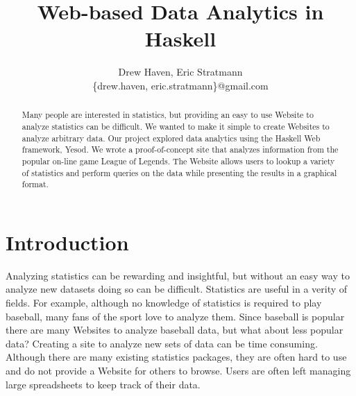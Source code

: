 \documentclass[letterpaper,twocolumn,9pt]{article}
\begin{document}
\vspace{-5cm}
\title{\Large \bf Web-based Data Analytics in Haskell}

\date{}

\author{
{\rm Drew Haven, Eric Stratmann}\\
\{drew.haven, eric.stratmann\}@gmail.com
} %

\maketitle


\begin{abstract}
Many people are interested in statistics, but providing an easy to use Website to analyze statistics can be difficult. We wanted to make it simple to create Websites to analyze arbitrary data. Our project explored data analytics using the Haskell Web framework, Yesod. We wrote a proof-of-concept site that analyzes information from the popular on-line game League of Legends. The Website allows users to lookup a variety of statistics and perform queries on the data while presenting the results in a graphical format.
\end{abstract}

\section{Introduction}

Analyzing statistics can be rewarding and insightful, but without an easy way to analyze new datasets doing so can be difficult. Statistics are useful in a verity of fields. For example, although no knowledge of statistics is required to play baseball, many fans of the sport love to analyze them. Since baseball is popular there are many Websites to analyze baseball data, but what about less popular data? Creating a site to analyze new sets of data can be time consuming. Although there are many existing statistics packages, they are often hard to use and do not provide a Website for others to browse. Users are often left managing large spreadsheets to keep track of their data.

\end{document}

